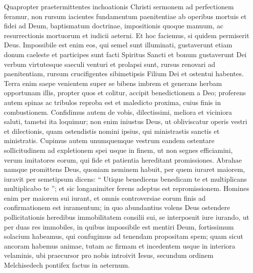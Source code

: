 \begin{biblechapter}
\begin{biblechapter}
\begin{biblechapter}
\begin{biblechapter}
\begin{biblechapter}
\begin{biblechapter}
\verse Quapropter praetermittentes inchoationis Christi sermonem ad perfectionem feramur, non rursum iacientes fundamentum paenitentiae ab operibus mortuis et fidei ad Deum, 
\verse baptismatum doctrinae, impositionis quoque manuum, ac resurrectionis mortuorum et iudicii aeterni. 
\verse Et hoc faciemus, si quidem permiserit Deus.
 \verse Impossibile est enim eos, qui semel sunt illuminati, gustaverunt etiam donum caeleste et participes sunt facti Spiritus Sancti 
\verse et bonum gustaverunt Dei verbum virtutesque saeculi venturi 
\verse et prolapsi sunt, rursus renovari ad paenitentiam, rursum crucifigentes sibimetipsis Filium Dei et ostentui habentes. 
\verse Terra enim saepe venientem super se bibens imbrem et generans herbam opportunam illis, propter quos et colitur, accipit benedictionem a Deo; 
\verse proferens autem spinas ac tribulos reproba est et maledicto proxima, cuius finis in combustionem.
 \verse Confidimus autem de vobis, dilectissimi, meliora et viciniora saluti, tametsi ita loquimur; 
\verse non enim iniustus Deus, ut obliviscatur operis vestri et dilectionis, quam ostendistis nomini ipsius, qui ministrastis sanctis et ministratis. 
\verse Cupimus autem unumquemque vestrum eandem ostentare sollicitudinem ad expletionem spei usque in finem, 
\verse ut non segnes efficiamini, verum imitatores eorum, qui fide et patientia hereditant promissiones.
 \verse Abrahae namque promittens Deus, quoniam neminem habuit, per quem iuraret maiorem, iuravit per semetipsum 
\verse dicens: “ Utique benedicens benedicam te et multiplicans multiplicabo te ”; 
\verse et sic longanimiter ferens adeptus est repromissionem. 
\verse Homines enim per maiorem sui iurant, et omnis controversiae eorum finis ad confirmationem est iuramentum; 
\verse in quo abundantius volens Deus ostendere pollicitationis heredibus immobilitatem consilii sui, se interposuit iure iurando, 
\verse ut per duas res immobiles, in quibus impossibile est mentiri Deum, fortissimum solacium habeamus, qui confugimus ad tenendam propositam spem; 
\verse quam sicut ancoram habemus animae, tutam ac firmam et incedentem usque in interiora velaminis, 
\verse ubi praecursor pro nobis introivit Iesus, secundum ordinem Melchisedech pontifex factus in aeternum.
 

\end{biblechapter}
\end{biblechapter}
\end{biblechapter}
\end{biblechapter}
\end{biblechapter}
\end{biblechapter}
